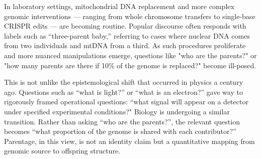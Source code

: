 \begin{commentary}
In laboratory settings, mitochondrial DNA replacement and more complex genomic interventions — ranging from whole chromosome transfers to single-base CRISPR edits — are becoming routine. Popular discourse often responds with labels such as “three-parent baby,” referring to cases where nuclear DNA comes from two individuals and mtDNA from a third. As such procedures proliferate and more nuanced manipulations emerge, questions like "who are the parents?" or "how many parents are there if 10\% of the genome is replaced?" become ill-posed.

This is not unlike the epistemological shift that occurred in physics a century ago. Questions such as “what is light?” or “what is an electron?” gave way to rigorously framed operational questions: “what signal will appear on a detector under specified experimental conditions?" Biology is undergoing a similar transition. Rather than asking “who are the parents?”, the relevant question becomes “what proportion of the genome is shared with each contributor?” Parentage, in this view, is not an identity claim but a quantitative mapping from genomic source to offspring structure.
\end{commentary}
\clearpage

